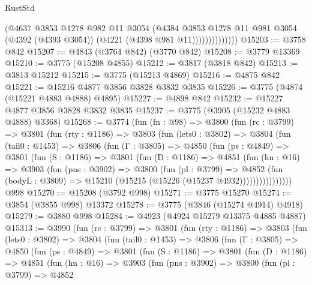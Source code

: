 \begin{lexlean}{RustStd}
\begin{coremodule}
{\begin{coremodule}
{{{{{{{{{{{{{{{{{{{{{{{{{{{{{{{                        (@4637
                          @3853
                          @1278
                          @982
                          @11
                          @3054
                          (@4384
                            @3853
                            @1278
                            @11
                            @981
                            @3054
                            (@4392 (@4393 @3054))
                            (@4221 (@4398 @981 @11))))))))))))))
@15203 := @3758 @842
@15207 := @4843 (@3764 @842) (@3770 @842)
@15208 := @3779 @13369
@15210 := @3775 (@15208 @4855)
@15212 := @3817 (@3818 @842)
@15213 := @3813 @15212
@15215 := @3775 (@15213 @4869)
@15216 := @4875 @842
@15221 := @15216 @4877 @3856 @3828 @3832 @3835
@15226 := @3775 (@4874 (@15221 @4883 @4888) @4895)
@15227 := @4898 @842
@15232 := @15227 @4877 @3856 @3828 @3832 @3835
@15237 := @3775 (@3905 (@15232 @4883 @4888) @3368)
@15268 := @3774
    (fun (fn : @98) =>
    @3800
      (fun (rc : @3799) =>
      @3801
        (fun (rty : @1186) =>
        @3803
          (fun (lets0 : @3802) =>
          @3804
            (fun (tail0 : @1453) =>
            @3806
              (fun (Γ : @3805) =>
              @4850
                (fun (ps : @4849) =>
                @3801
                  (fun (S : @1186) =>
                  @3801
                    (fun (D : @1186) =>
                    @4851
                      (fun (hn : @16) =>
                      @3903
                        (fun (pns : @3902) =>
                        @3800
                          (fun (pl : @3799) =>
                          @4852
                            (fun (bodyL : @3809) =>
                            @15210 (@15215 (@15226 (@15237 @4932))))))))))))))))
    @998
@15270 := @15208 (@3792 @998)
@15271 := @3775 @15270
@15274 := @3854 (@3855 @998) @13372
@15278 := @3775 (@3846 (@15274 @4914) @4918)
@15279 := @3880 @998
@15284 := @4923 (@4924 @15279 @13375 @4885 @4887)
@15313 := @3990
    (fun (rc : @3799) =>
    @3801
      (fun (rty : @1186) =>
      @3803
        (fun (lets0 : @3802) =>
        @3804
          (fun (tail0 : @1453) =>
          @3806
            (fun (Γ : @3805) =>
            @4850
              (fun (ps : @4849) =>
              @3801
                (fun (S : @1186) =>
                @3801
                  (fun (D : @1186) =>
                  @4851
                    (fun (hn : @16) =>
                    @3903
                      (fun (pns : @3902) =>
                      @3800
                        (fun (pl : @3799) =>
                        @4852
}}}}}}}}}}}}}}}}}}}}}}}}}}}}}}}
\end{coremodule}}
\end{coremodule}
\end{lexlean}
